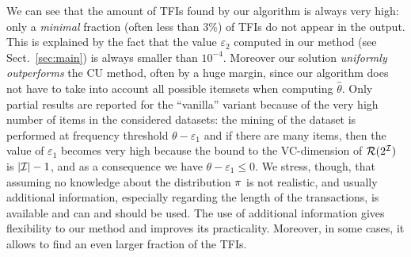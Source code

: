 We can see that the amount of TFIs
found by our algorithm is always very high: only a \emph{minimal}
fraction (often less than $3\%$) %
of TFIs do not appear in the output. This is explained by the fact that the
value $\varepsilon_2$ computed in our method (see Sect.~\ref{sec:main}) is
always smaller than $10^{-4}$. Moreover our solution
\emph{uniformly outperforms} the CU method, often by a huge margin, since
 our algorithm does not have to take into account all
possible itemsets when computing $\hat\theta$. %
Only partial results are reported for the ``vanilla'' variant because of the
very high number of items in the considered datasets: the mining of the
dataset is performed at frequency threshold $\theta-\varepsilon_1$  and if there
are many items, then the value of $\varepsilon_1$ becomes very high because the
bound to the VC-dimension of $\mathcal{R}(2^{\cal I})$ is $|{\cal I}|-1$, and as a
consequence we have $\theta-\varepsilon_1\le 0$. %
We stress, though, that assuming no knowledge about the distribution $\pi$ is not realistic, and
usually additional information, especially regarding the length of the
transactions, is available and can and should be used. The use of 
additional information gives flexibility to our method and improves its
practicality. Moreover, in some cases, it allows to find an even larger fraction
of the TFIs.

